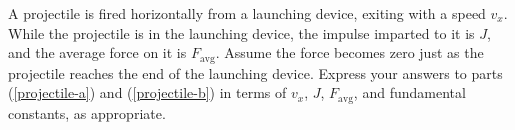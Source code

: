 \documentclass{../../../oss-apphys-exam}
\begin{document}
\begin{questions}
%    
%    
%    

  \question A projectile is fired horizontally from a launching device, exiting
  with a speed $v_x$. While the projectile is in the launching device, the
  impulse imparted to it is $J$, and the average force on it is $F_\text{avg}$.
  Assume the force becomes zero just as the projectile reaches the end of the
  launching device. Express your answers to parts (\ref{projectile-a}) and
  (\ref{projectile-b}) in terms of $v_x$, $J$, $F_\text{avg}$, and fundamental
  constants, as appropriate.
\end{questions}
\end{document}
